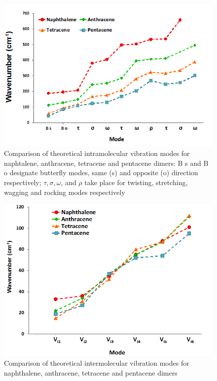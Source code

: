 \begin{figure}[h]
	\centering
	\includegraphics[scale=0.85]{image/intramolecular-v}
	\caption[Comparison of theoretical intramolecular vibration modes for acenes dimers]{Comparison of theoretical intramolecular vibration modes for naphtalene, anthracene, tetracene and pentacene dimers: B s and B o designate butterfly modes, same (s) and opposite (o) direction respectively; $\tau, \sigma, \omega$, and $\rho$ take place for twisting, stretching, wagging and rocking modes respectively}
\end{figure}

\begin{figure}[h]
	\centering
	\includegraphics[scale=0.75]{image/intermolecular-v}
	\caption[Comparison of theoretical intermolecular vibration modes for acenes dimers]{Comparison of theoretical intermolecular vibration modes for naphthalene, anthracene, tetracene and pentacene dimers}
\end{figure}

